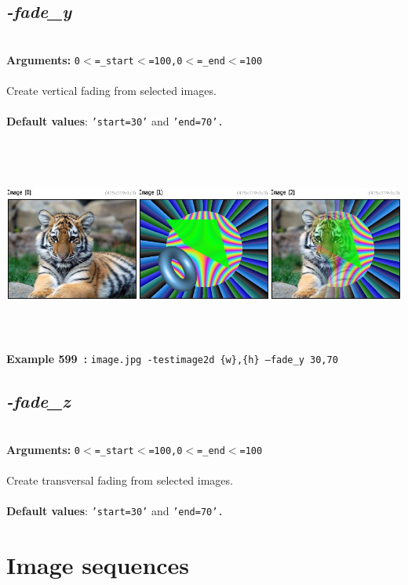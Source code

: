 \documentclass[a4paper,11pt,twoside]{book}
\begin{document}
\subsection{\emph{-fade\_y} }\vspace*{-0.5em}
~\\\textbf{Arguments: } 
{\small \texttt{0$<$=\_start$<$=100,0$<$=\_end$<$=100}}\\~\\
Create vertical fading from selected images.
~\\~\\\textbf{Default values}: {\small \texttt{'start=30'} and \texttt{'end=70'.}}
\begin{center}\includegraphics[keepaspectratio=true,height=7cm,width=\textwidth]{img/gmic_def599.jpg}\\
{\footnotesize \textbf{Example 599~:} \texttt{image.jpg -testimage2d \{w\},\{h\} --fade\_y 30,70}}
\end{center}

\subsection{\emph{-fade\_z} }\vspace*{-0.5em}
~\\\textbf{Arguments: } 
{\small \texttt{0$<$=\_start$<$=100,0$<$=\_end$<$=100}}\\~\\
Create transversal fading from selected images.
~\\~\\\textbf{Default values}: {\small \texttt{'start=30'} and \texttt{'end=70'.}}

\section{Image sequences}
\end{document}

